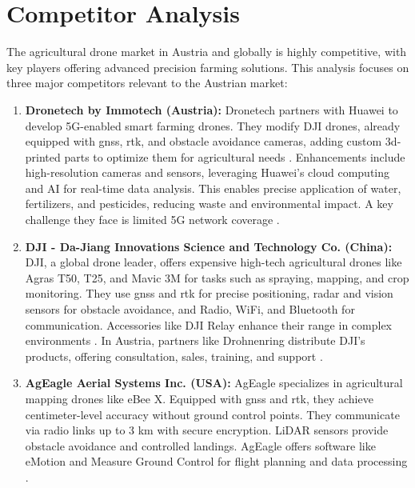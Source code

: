 \section{Competitor Analysis}

The agricultural drone market in Austria and globally is highly competitive, with key players offering advanced precision farming solutions. This analysis focuses on three major competitors relevant to the Austrian market:

\begin{enumerate} 
	\item \textbf{Dronetech by Immotech (Austria):} Dronetech partners with Huawei to develop 5G-enabled smart farming drones. They modify DJI drones, already equipped with \acrfull{gnss}, \acrfull{rtk}, and obstacle avoidance cameras, adding custom \acrfull{3d}-printed parts to optimize them for agricultural needs \cite{dronetech_instagram, dji_m300}. Enhancements include high-resolution cameras and sensors, leveraging Huawei's cloud computing and AI for real-time data analysis. This enables precise application of water, fertilizers, and pesticides, reducing waste and environmental impact. A key challenge they face is limited 5G network coverage \cite{huawei_dronetech_2022, huawei_boosting_farming_2022, dronetech_smart_farming_project}.
	
	\item \textbf{DJI - Da-Jiang Innovations Science and Technology Co. (China):} DJI, a global drone leader, offers expensive high-tech agricultural drones like Agras T50, T25, and Mavic 3M for tasks such as spraying, mapping, and crop monitoring. They use \acrshort{gnss} and \acrshort{rtk} for precise positioning, radar and vision sensors for obstacle avoidance, and Radio, WiFi, and Bluetooth for communication. Accessories like DJI Relay enhance their range in complex environments \cite{dji_ag_t25, dji_ag_t50}. In Austria, partners like Drohnenring distribute DJI's products, offering consultation, sales, training, and support \cite{drohnenring_2024}.
	
	\item \textbf{AgEagle Aerial Systems Inc. (USA):} AgEagle specializes in agricultural mapping drones like eBee X. Equipped with \acrshort{gnss} and \acrshort{rtk}, they achieve centimeter-level accuracy without ground control points. They communicate via radio links up to 3 km with secure encryption. LiDAR sensors provide obstacle avoidance and controlled landings. AgEagle offers software like eMotion and Measure Ground Control for flight planning and data processing \cite{ageagle_agriculture_2024, ageagle_agriculture_ebee}.
\end{enumerate}

